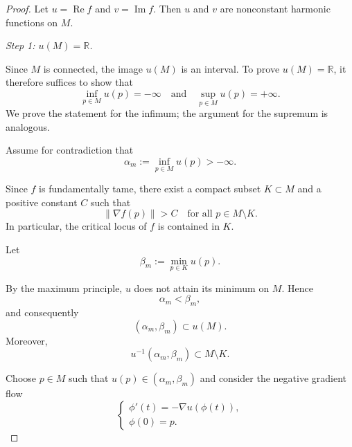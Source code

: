 \documentclass[11pt]{amsart}
\theoremstyle{plain}
\theoremstyle{definition}
\theoremstyle{remark}
\numberwithin{equation}{section}
\begin{document}
\begin{proof}
    Let $u = \operatorname{Re} f$ and $v = \operatorname{Im} f$.
    Then $u$ and $v$ are nonconstant harmonic functions on $M$.

    \medskip
    \noindent\emph{Step 1: $u(M) = \mathbb{R}$.}

    Since $M$ is connected, the image $u(M)$ is an interval.
    To prove $u(M) = \mathbb{R}$, it therefore suffices to show that
    \begin{equation}
        \inf_{p \in M} u(p) = -\infty \quad \text{and} \quad \sup_{p \in M} u(p) = +\infty.
    \end{equation}
    We prove the statement for the infimum; the argument for the supremum is analogous.

    Assume for contradiction that
    \begin{equation}
        \alpha_m := \inf_{p \in M} u(p) > -\infty.
    \end{equation}

    Since $f$ is fundamentally tame, there exist a compact subset $K \subset M$ and a positive constant $C$ such that
    \begin{equation}
        \|\nabla f(p)\| > C \quad \text{for all } p \in M \setminus K.
    \end{equation}
    In particular, the critical locus of $f$ is contained in $K$.

    Let
    \begin{equation}
        \beta_m := \min_{p \in K} u(p).
    \end{equation}

    By the maximum principle, $u$ does not attain its minimum on $M$.
    Hence
    \begin{equation}
        \alpha_m < \beta_m,
    \end{equation}
    and consequently
    \begin{equation}
        (\alpha_m, \beta_m) \subset u(M).
    \end{equation}
    Moreover,
    \begin{equation}
        u^{-1}(\alpha_m, \beta_m) \subset M \setminus K.
    \end{equation}

    Choose $p \in M$ such that $u(p) \in (\alpha_m, \beta_m)$ and consider the negative gradient flow
    \begin{equation}
        \begin{cases}
            \phi'(t) = -\nabla u(\phi(t)),\\
            \phi(0) = p.
        \end{cases}
    \end{equation}


\end{proof}
\end{document}
